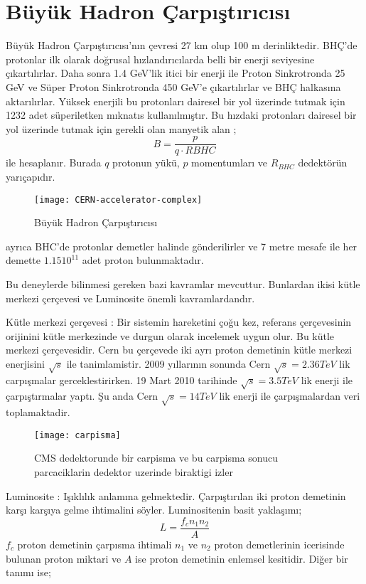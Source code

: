 \section{Büyük Hadron Çarpıştırıcısı}
Büyük Hadron Çarpıştırıcısı'nın çevresi 27 km olup 100 m derinliktedir. BHÇ'de protonlar ilk olarak doğrusal hızlandırıcılarda belli bir enerji seviyesine çıkartılırlar. Daha sonra 1.4 GeV'lik itici bir enerji ile Proton Sinkrotronda 25 GeV ve Süper Proton Sinkrotronda 450 GeV'e çıkartılırlar ve BHÇ halkasına aktarılırlar. Yüksek enerjili bu protonları dairesel bir yol üzerinde tutmak için 1232 adet süperiletken mıknatıs kullanılmıştır. Bu hızdaki protonları dairesel bir yol üzerinde tutmak için gerekli olan manyetik alan ;
\begin{equation}
B= \frac{p}{q \cdot R{BHC}}
\end{equation}
ile hesaplanır. Burada $q$ protonun yükü, $p$ momentumları ve $R_{BHC}$ dedektörün yarıçapıdır.
\begin{figure}[!htbp]
\centering
\texttt{[image: CERN-accelerator-complex]}
\caption{Büyük Hadron Çarpıştırıcısı}
\end{figure}
  ayrıca BHC'de protonlar demetler halinde gönderilirler ve 7 metre mesafe ile her demette $1.15 10^{11}$ adet proton bulunmaktadır.

Bu deneylerde bilinmesi gereken bazi kavramlar mevcuttur. Bunlardan ikisi kütle merkezi çerçevesi ve Luminosite önemli kavramlardandır.\\
\par Kütle merkezi çerçevesi : Bir sistemin hareketini çoğu kez, referans çerçevesinin orijinini kütle merkezinde ve durgun olarak incelemek uygun olur. Bu kütle merkezi çerçevesidir. Cern bu çerçevede iki ayrı proton demetinin kütle merkezi enerjisini $\sqrt{s}$ ile tanimlamistir. 2009 yıllarının sonunda Cern $\sqrt{s}=2.36 TeV$ lik carpışmalar gerceklestirirken. 19 Mart 2010 tarihinde $\sqrt{s}=3.5 TeV$ lik enerji ile çarpıştırmalar yaptı. Şu anda Cern $\sqrt{s}=14 TeV$ lik enerji ile çarpışmalardan veri toplamaktadir.
\begin{figure}[!htbp]
\centering
\texttt{[image: carpisma]}
\caption{CMS dedektorunde bir carpisma ve bu carpisma sonucu parcaciklarin dedektor uzerinde biraktigi izler}
\end{figure}

Luminosite : Işıklılık anlamına gelmektedir. Çarpıştırılan iki proton demetinin karşı karşıya gelme ihtimalini söyler. Luminositenin basit yaklaşımı;
\begin{equation}
L= \frac{f_c n_1 n_2}{A}
\end{equation}
$f_c$ proton demetinin çarpısma ihtimali $n_1$ ve $n_2$ proton demetlerinin icerisinde bulunan proton miktari ve $A$ ise proton demetinin enlemsel kesitidir. Diğer bir tanımı ise;


